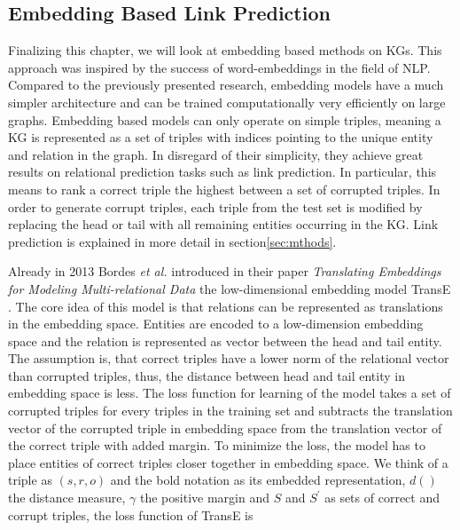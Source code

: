 

\subsection{Embedding Based Link Prediction}
\label{ssec:embedlp}
Finalizing this chapter, we will look at embedding based methods on KGs. This approach was inspired by the success of word-embeddings in the field of NLP. Compared to the previously presented research, embedding models have a much simpler architecture and can be trained computationally very efficiently on large graphs. Embedding based models can only operate on simple triples, meaning a KG is represented as a set of triples with indices pointing to the unique entity and relation in the graph. In disregard of their simplicity, they achieve great results on relational prediction tasks such as link prediction. In particular, this means to rank a correct triple the highest between a set of corrupted triples. In order to generate corrupt triples, each triple from the test set is modified by replacing the head or tail with all remaining entities occurring in the KG. Link prediction is explained in more detail in section\ref{sec:mthods}. 


Already in 2013 Bordes \textit{et al.} introduced in their paper \textit{Translating Embeddings for Modeling Multi-relational Data} the low-dimensional embedding model TransE \cite{bordes_translating_2013}. The core idea of this model is that relations can be represented as translations in the embedding space. Entities are encoded to a low-dimension embedding space and the relation is represented as vector between the head and tail entity. The assumption is, that correct triples have a lower norm of the relational vector than corrupted triples, thus, the distance between head and tail entity in embedding space is less. The loss function for learning of the model takes a set of corrupted triples for every triples in the training set and subtracts the translation vector of the corrupted triple in embedding space from the translation vector of the correct triple with added margin. To minimize the loss, the model has to place entities of correct triples closer together in embedding space. We think of a triple as $(s,r,o)$ and the bold notation as its embedded representation, $d()$ the distance measure, $\gamma$ the positive margin and $S$ and $S^{\prime}$ as sets of correct and corrupt triples, the loss function of TransE is 

